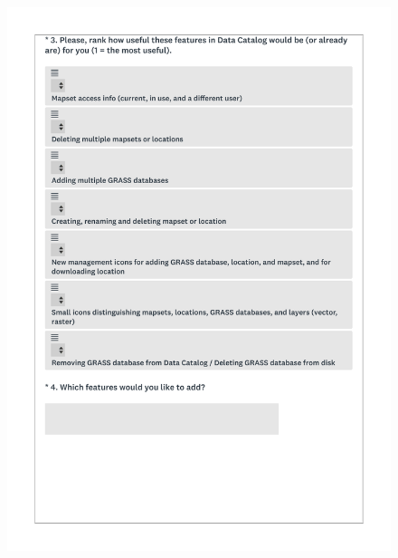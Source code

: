 \documentclass[a4paper,10pt,twoside]{article}
\begin{document}
 \newpage
 \begin{figure}[hbt!]
 \begin{center}
 \includegraphics[width=15.5cm]{../surveys/questionnaires/survey1_part1_page5_questions3_4.pdf}
 \end{center}
 \end{figure}
 
\end{document}
